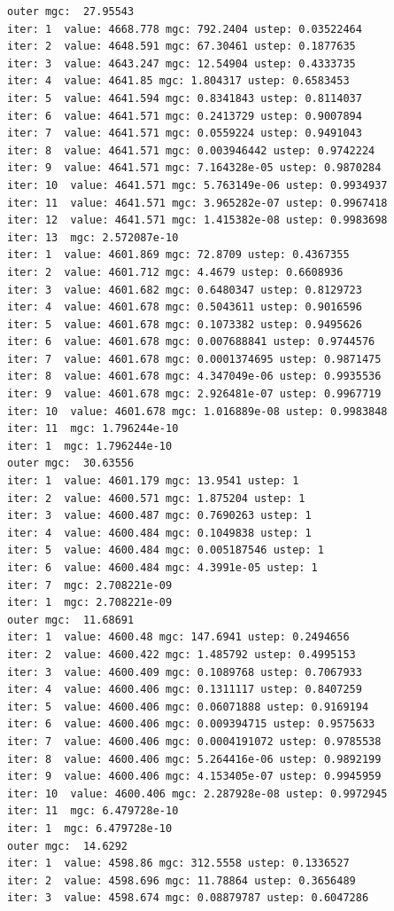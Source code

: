 \documentclass[
  letterpaper,
  DIV=11,
  numbers=noendperiod]{scrartcl}
\begin{document}
\begin{verbatim}
outer mgc:  27.95543 
iter: 1  value: 4668.778 mgc: 792.2404 ustep: 0.03522464 
iter: 2  value: 4648.591 mgc: 67.30461 ustep: 0.1877635 
iter: 3  value: 4643.247 mgc: 12.54904 ustep: 0.4333735 
iter: 4  value: 4641.85 mgc: 1.804317 ustep: 0.6583453 
iter: 5  value: 4641.594 mgc: 0.8341843 ustep: 0.8114037 
iter: 6  value: 4641.571 mgc: 0.2413729 ustep: 0.9007894 
iter: 7  value: 4641.571 mgc: 0.0559224 ustep: 0.9491043 
iter: 8  value: 4641.571 mgc: 0.003946442 ustep: 0.9742224 
iter: 9  value: 4641.571 mgc: 7.164328e-05 ustep: 0.9870284 
iter: 10  value: 4641.571 mgc: 5.763149e-06 ustep: 0.9934937 
iter: 11  value: 4641.571 mgc: 3.965282e-07 ustep: 0.9967418 
iter: 12  value: 4641.571 mgc: 1.415382e-08 ustep: 0.9983698 
iter: 13  mgc: 2.572087e-10 
iter: 1  value: 4601.869 mgc: 72.8709 ustep: 0.4367355 
iter: 2  value: 4601.712 mgc: 4.4679 ustep: 0.6608936 
iter: 3  value: 4601.682 mgc: 0.6480347 ustep: 0.8129723 
iter: 4  value: 4601.678 mgc: 0.5043611 ustep: 0.9016596 
iter: 5  value: 4601.678 mgc: 0.1073382 ustep: 0.9495626 
iter: 6  value: 4601.678 mgc: 0.007688841 ustep: 0.9744576 
iter: 7  value: 4601.678 mgc: 0.0001374695 ustep: 0.9871475 
iter: 8  value: 4601.678 mgc: 4.347049e-06 ustep: 0.9935536 
iter: 9  value: 4601.678 mgc: 2.926481e-07 ustep: 0.9967719 
iter: 10  value: 4601.678 mgc: 1.016889e-08 ustep: 0.9983848 
iter: 11  mgc: 1.796244e-10 
iter: 1  mgc: 1.796244e-10 
outer mgc:  30.63556 
iter: 1  value: 4601.179 mgc: 13.9541 ustep: 1 
iter: 2  value: 4600.571 mgc: 1.875204 ustep: 1 
iter: 3  value: 4600.487 mgc: 0.7690263 ustep: 1 
iter: 4  value: 4600.484 mgc: 0.1049838 ustep: 1 
iter: 5  value: 4600.484 mgc: 0.005187546 ustep: 1 
iter: 6  value: 4600.484 mgc: 4.3991e-05 ustep: 1 
iter: 7  mgc: 2.708221e-09 
iter: 1  mgc: 2.708221e-09 
outer mgc:  11.68691 
iter: 1  value: 4600.48 mgc: 147.6941 ustep: 0.2494656 
iter: 2  value: 4600.422 mgc: 1.485792 ustep: 0.4995153 
iter: 3  value: 4600.409 mgc: 0.1089768 ustep: 0.7067933 
iter: 4  value: 4600.406 mgc: 0.1311117 ustep: 0.8407259 
iter: 5  value: 4600.406 mgc: 0.06071888 ustep: 0.9169194 
iter: 6  value: 4600.406 mgc: 0.009394715 ustep: 0.9575633 
iter: 7  value: 4600.406 mgc: 0.0004191072 ustep: 0.9785538 
iter: 8  value: 4600.406 mgc: 5.264416e-06 ustep: 0.9892199 
iter: 9  value: 4600.406 mgc: 4.153405e-07 ustep: 0.9945959 
iter: 10  value: 4600.406 mgc: 2.287928e-08 ustep: 0.9972945 
iter: 11  mgc: 6.479728e-10 
iter: 1  mgc: 6.479728e-10 
outer mgc:  14.6292 
iter: 1  value: 4598.86 mgc: 312.5558 ustep: 0.1336527 
iter: 2  value: 4598.696 mgc: 11.78864 ustep: 0.3656489 
iter: 3  value: 4598.674 mgc: 0.08879787 ustep: 0.6047286 

\end{verbatim}
\end{document}
